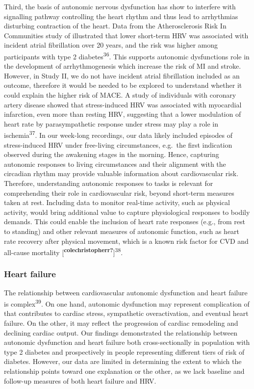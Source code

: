 \documentclass[
  a4paper,
  headsepline=true,
  open=any]{scrbook}
\begin{document}
Third, the basis of autonomic nervous dysfunction has show to interfere
with signalling pathway controlling the heart rhythm and thus lead to
arrhythmias disturbing contraction of the heart. Data from the
Atherosclerosis Risk In Communities study of illustrated that lower
short-term HRV was associated with incident atrial fibrillation over 20
years, and the risk was higher among participants with type 2
diabetes\textsuperscript{36}. This supports autonomic dysfunctions role
in the development of arrhythmogenesis which increase the risk of MI and
stroke. However, in Study II, we do not have incident atrial
fibrillation included as an outcome, therefore it would be needed to be
explored to understand whether it could explain the higher risk of MACE.
A study of individuals with coronary artery disease showed that
stress-induced HRV was associated with myocardial infarction, even more
than resting HRV, suggesting that a lower modulation of heart rate by
parasympathetic response under stress may play a role in
ischemia\textsuperscript{37}. In our week-long recordings, our data
likely included episodes of stress-induced HRV under free-living
circumstances, e.g.~the first indication observed during the awakening
stages in the morning. Hence, capturing autonomic responses to living
circumstances and their alignment with the circadian rhythm may provide
valuable information about cardiovascular risk. Therefore, understanding
autonomic responses to tasks is relevant for comprehending their role in
cardiovascular risk, beyond short-term measures taken at rest. Including
data to monitor real-time activity, such as physical activity, would
bring additional value to capture physiological responses to bodily
demands. This could enable the inclusion of heart rate responses (e.g.,
from rest to standing) and other relevant measures of autonomic
function, such as heart rate recovery after physical movement, which is
a known risk factor for CVD and all-cause mortality
{[}\textsuperscript{\textbf{colechristopherr?}}{]}\textsuperscript{38}.

\hypertarget{heart-failure-1}{%
\subsubsection{Heart failure}\label{heart-failure-1}}

The relationship between cardiovascular autonomic dysfunction and heart
failure is complex\textsuperscript{39}. On one hand, autonomic
dysfunction may represent complication of that contributes to cardiac
stress, sympathetic overactivation, and eventual heart failure. On the
other, it may reflect the progression of cardiac remodeling and
declining cardiac output. Our findings demonstrated the relationship
between autonomic dysfunction and heart failure both cross-sectionally
in population with type 2 diabetes and prospectively in people
representing different tiers of risk of diabetes. However, our data are
limited in determining the extent to which the relationship points
toward one explanation or the other, as we lack baseline and follow-up
measures of both heart failure and HRV.
\end{document}

